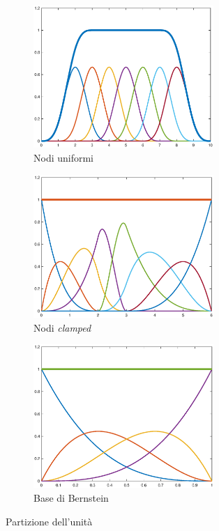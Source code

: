 \documentclass[a4paper, 12pt]{article}
\begin{document}
\begin{figure}[]
  \centering
  \begin{subfigure}[b]{0.45\textwidth}
    \includegraphics[width=0.75\textwidth]{figure/unity_std.eps}
    \caption{Nodi uniformi}
    \label{fig:unity_std}
  \end{subfigure}
  \begin{subfigure}[b]{0.45\textwidth}
    \includegraphics[width=0.75\textwidth]{figure/unity_3.eps}
    \caption{Nodi \textit{clamped}}
    \label{fig:unity_clamped}
  \end{subfigure}
  \begin{subfigure}[b]{0.5\textwidth}
    \includegraphics[width=0.75\textwidth]{figure/unity_bernstein.eps}
    \caption{Base di Bernstein}
    \label{fig:unity_bernstein}
  \end{subfigure}
  \caption{Partizione dell'unità}\label{fig:unity_partition}
\end{figure}
\end{document}
